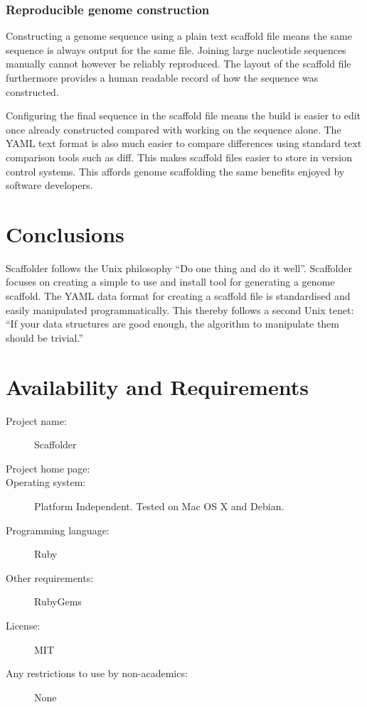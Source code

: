\documentclass[10pt]{bmc_article}
\newenvironment{bmcformat}{\begin{raggedright}\baselineskip20pt\sloppy\setboolean{publ}{false}}{\end{raggedright}\baselineskip20pt\sloppy}
\begin{document}
\begin{bmcformat}
\subsubsection*{Reproducible genome construction}

Constructing a genome sequence using a plain text scaffold file means the same
sequence is always output for the same file. Joining large nucleotide
sequences manually cannot however be reliably reproduced. The layout of the
scaffold file furthermore provides a human readable record of how the sequence
was constructed. \pb

Configuring the final sequence in the scaffold file means the build is easier
to edit once already constructed compared with working on the sequence alone.
The YAML text format is also much easier to compare differences using standard
text comparison tools such as diff. This makes scaffold files easier to store
in version control systems. This affords genome scaffolding the same benefits
enjoyed by software developers. \pb 

\clearpage

\section*{Conclusions} %

Scaffolder follows the Unix philosophy ``Do one thing and do it well''.
Scaffolder focuses on creating a simple to use and install tool for generating
a genome scaffold. The YAML data format for creating a scaffold file is
standardised and easily manipulated programmatically. This thereby follows
a second Unix tenet: ``If your data structures are good enough, the algorithm
to manipulate them should be trivial.''

\clearpage

\section*{Availability and Requirements} %

  \begin{description}
    \item[Project name:] Scaffolder
    \item[Project home page:] \scaffolder
    \item[Operating system:] Platform Independent. Tested on Mac OS X and
    Debian.
    \item[Programming language:] Ruby
    \item[Other requirements:] RubyGems
    \item[License:] MIT
    \item[Any restrictions to use by non-academics:] None
  \end{description}


\end{bmcformat}
\end{document}

